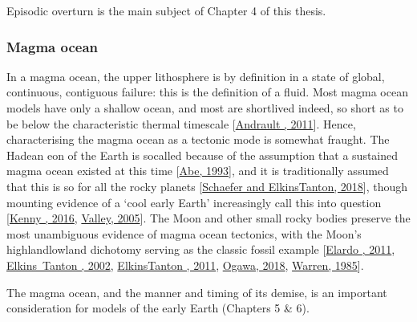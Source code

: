 \documentclass[letterpaper,10pt,english]{jupyterBook}
\begin{document}
\sphinxAtStartPar
Episodic overturn is the main subject of Chapter 4 of this thesis.


\subsubsection{Magma ocean}
\label{\detokenize{content/chapter_01_background/main:magma-ocean}}
\sphinxAtStartPar
In a magma ocean, the upper lithosphere is by definition in a state of global, continuous, contiguous failure: this is the definition of a fluid. Most magma ocean models have only a shallow ocean, and most are short\sphinxhyphen{}lived \sphinxhyphen{} indeed, so short as to be below the characteristic thermal timescale {[}\hyperlink{cite.references:id430}{Andrault , 2011}{]}. Hence, characterising the magma ocean as a tectonic mode is somewhat fraught. The Hadean eon of the Earth is so\sphinxhyphen{}called because of the assumption that a sustained magma ocean existed at this time {[}\hyperlink{cite.references:id79}{Abe, 1993}{]}, and it is traditionally assumed that this is so for all the rocky planets {[}\hyperlink{cite.references:id413}{Schaefer and Elkins\sphinxhyphen{}Tanton, 2018}{]}, though mounting evidence of a ‘cool early Earth’ increasingly call this into question {[}\hyperlink{cite.references:id542}{Kenny , 2016}, \hyperlink{cite.references:id541}{Valley, 2005}{]}. The Moon and other small rocky bodies preserve the most unambiguous evidence of magma ocean tectonics, with the Moon’s highland\sphinxhyphen{}lowland dichotomy serving as the classic fossil example {[}\hyperlink{cite.references:id544}{Elardo , 2011}, \hyperlink{cite.references:id545}{Elkins Tanton , 2002}, \hyperlink{cite.references:id543}{Elkins\sphinxhyphen{}Tanton , 2011}, \hyperlink{cite.references:id453}{Ogawa, 2018}, \hyperlink{cite.references:id546}{Warren, 1985}{]}.

\sphinxAtStartPar
The magma ocean, and the manner and timing of its demise, is an important consideration for models of the early Earth (Chapters 5 \& 6).
\end{document}
